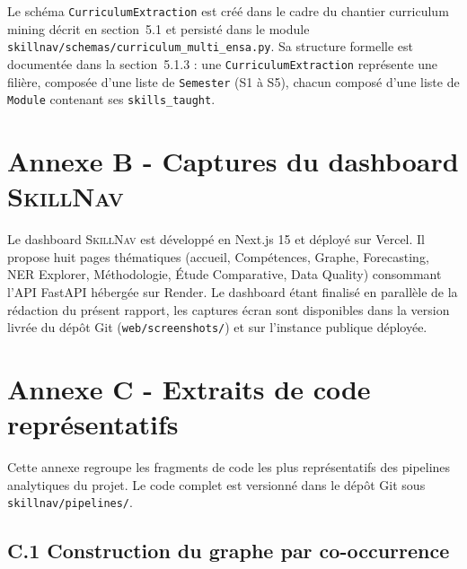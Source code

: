 \documentclass[11pt,a4paper,openany]{report}
\newcommand{\skillnav}{\textsc{SkillNav}\xspace}
\begin{document}
Le sch\'ema \texttt{CurriculumExtraction} est cr\'e\'e dans le cadre du chantier curriculum mining d\'ecrit en section~5.1 et persist\'e dans le module \texttt{skillnav/schemas/curriculum\_multi\_ensa.py}. Sa structure formelle est document\'ee dans la section~5.1.3 : une \texttt{CurriculumExtraction} repr\'esente une fili\`ere, compos\'ee d'une liste de \texttt{Semester} (S1 \`a S5), chacun compos\'e d'une liste de \texttt{Module} contenant ses \texttt{skills\_taught}.

\section*{Annexe B - Captures du dashboard \skillnav}

Le dashboard \skillnav est d\'evelopp\'e en Next.js 15 et d\'eploy\'e sur Vercel. Il propose huit pages th\'ematiques (accueil, Comp\'etences, Graphe, Forecasting, NER Explorer, M\'ethodologie, \'Etude Comparative, Data Quality) consommant l'API FastAPI h\'eberg\'ee sur Render. Le dashboard \'etant finalis\'e en parall\`ele de la r\'edaction du pr\'esent rapport, les captures \'ecran sont disponibles dans la version livr\'ee du d\'ep\^ot Git (\texttt{web/screenshots/}) et sur l'instance publique d\'eploy\'ee.

\section*{Annexe C - Extraits de code repr\'esentatifs}

Cette annexe regroupe les fragments de code les plus repr\'esentatifs des pipelines analytiques du projet. Le code complet est versionn\'e dans le d\'ep\^ot Git sous \texttt{skillnav/pipelines/}.

\subsection*{C.1 Construction du graphe par co-occurrence}
\end{document}
